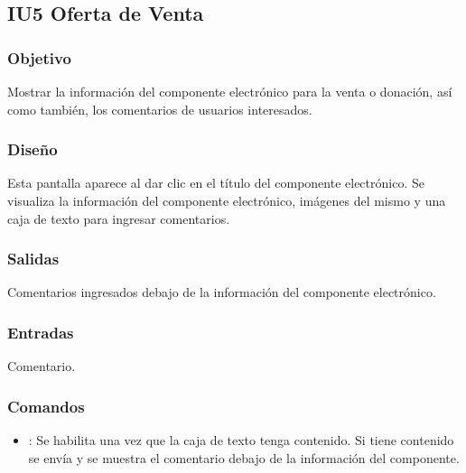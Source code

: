 \subsection{IU5 Oferta de Venta}

\subsubsection{Objetivo}
	Mostrar la información del componente electrónico para la venta o donación, así como también, los comentarios de usuarios interesados.
	
\subsubsection{Diseño}
	Esta pantalla aparece al dar clic en el título del componente electrónico. Se visualiza la información del componente electrónico, imágenes del mismo y una caja de texto para ingresar comentarios.


\subsubsection{Salidas}

	Comentarios ingresados debajo de la información del componente electrónico.

\subsubsection{Entradas}
Comentario.

\subsubsection{Comandos}
\begin{itemize}
	\item {}: Se habilita una vez que la caja de texto tenga contenido. Si tiene contenido se envía y se muestra el comentario debajo de la información del componente.
\end{itemize}

